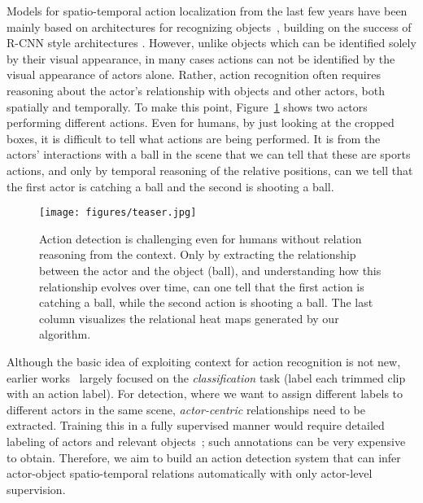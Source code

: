 \documentclass[runningheads]{llncs}
\begin{document}
Models for spatio-temporal action localization from the last few years have been mainly based on architectures for recognizing objects~\cite{gkioxari2017interactnet,peng2016multi,weinzaepfel2016}, building on the success of R-CNN style architectures \cite{girshick2015fast,girshick2014rich,ren2015faster}. However, unlike objects which can be identified solely by their visual appearance, in many cases actions can not be identified by the visual appearance of actors alone. Rather, action recognition often requires reasoning about the actor's relationship with objects and other actors, both spatially and temporally. To make this point, Figure~\ref{fig:teaser} shows two actors performing different actions. Even for humans, by just looking at the cropped boxes, it is difficult to tell what actions are being performed. It is from the actors' interactions with a ball in the scene that we can tell that these are sports actions, and only by temporal reasoning of the relative positions, can we tell that the first actor is catching a ball and the second is shooting a ball.

\begin{figure}[t]
    \centering
    \texttt{[image: figures/teaser.jpg]}
    \caption{Action detection is challenging even for humans without relation reasoning from the context. Only by extracting the relationship between the actor and the object (ball), and understanding how this relationship evolves over time, can one tell that the first action is catching a ball, while the second action is shooting a ball. The last column visualizes the relational heat maps generated by our algorithm.
    }
    \label{fig:teaser}
    \vspace{-1em}
\end{figure}

Although the basic idea of exploiting context for action recognition is not new, earlier works~\cite{dai_iccv17,Marszalek2009,non_local} largely focused on the \textit{classification} task (label each trimmed clip with an action label). For detection, where we want to assign different labels to different actors in the same scene, \emph{actor-centric} relationships need to be extracted. Training this in a fully supervised manner would require detailed labeling of actors and relevant objects~\cite{hico_det_wacv2018,gupta2015exploring}; such annotations can be very expensive to obtain. Therefore, we aim to build an action detection system that can infer actor-object spatio-temporal relations automatically with only actor-level supervision.
\end{document}
